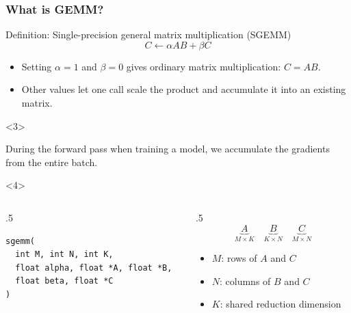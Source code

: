\documentclass[../main.tex]{subfiles}
\begin{document}
\begin{frame}[fragile]
  \frametitle{What is GEMM?}
  \begin{block}{Definition: Single-precision general matrix multiplication (SGEMM)}
    \[
      C \leftarrow \alpha AB + \beta C
    \]
  \end{block}

  \pause
  \begin{itemize}
    \item Setting $\alpha=1$ and $\beta=0$ gives ordinary matrix multiplication: $C=AB$.
    \item Other values let one call scale the product and accumulate it into an existing matrix.
  \end{itemize}

  \pause
  \begin{onlyenv}<3>
    \begin{example}
      During the forward pass when training a model, we accumulate the gradients
      from the entire batch.
    \end{example}
  \end{onlyenv}

  \begin{onlyenv}<4>
    \begin{columns}
      \begin{column}{.5\linewidth}
        \begin{lstlisting}
sgemm(
  int M, int N, int K,
  float alpha, float *A, float *B,
  float beta, float *C
)
        \end{lstlisting}
      \end{column}

      \begin{column}{.5\linewidth}
        \[
          \underbrace{A}_{M\times K} \quad
          \underbrace{B}_{K\times N} \quad
          \underbrace{C}_{M\times N}
        \]

        \begin{itemize}
          \item \(M\): rows of \(A\) and \(C\)
          \item \(N\): columns of \(B\) and \(C\)
          \item \(K\): shared reduction dimension
        \end{itemize}
      \end{column}
    \end{columns}
  \end{onlyenv}

\end{frame}
\end{document}

